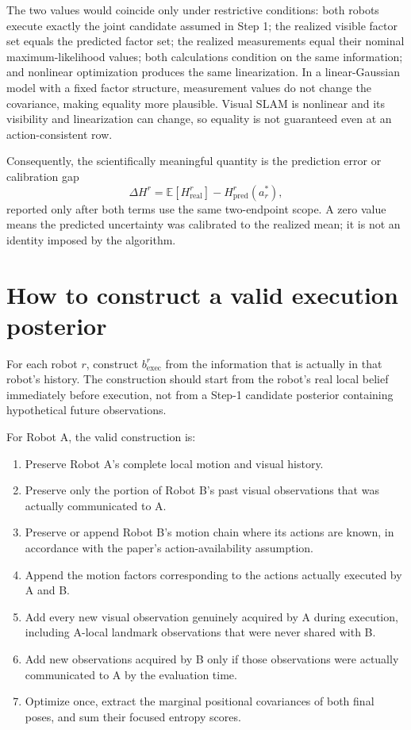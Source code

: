\documentclass[11pt,a4paper]{article}
\begin{document}
The two values would coincide only under restrictive conditions: both robots
execute exactly the joint candidate assumed in Step 1; the realized visible
factor set equals the predicted factor set; the realized measurements equal
their nominal maximum-likelihood values; both calculations condition on the
same information; and nonlinear optimization produces the same linearization.
In a linear-Gaussian model with a fixed factor structure, measurement values
do not change the covariance, making equality more plausible.  Visual SLAM is
nonlinear and its visibility and linearization can change, so equality is not
guaranteed even at an action-consistent row.

Consequently, the scientifically meaningful quantity is the prediction error
or calibration gap
\[
  \Delta H^r
  =\mathbb E\!\left[H_{\mathrm{real}}^r\right]
   -H_{\mathrm{pred}}^r(a_r^*),
\]
reported only after both terms use the same two-endpoint scope.  A zero value
means the predicted uncertainty was calibrated to the realized mean; it is not
an identity imposed by the algorithm.

\section{How to construct a valid execution posterior}

For each robot $r$, construct $b_{\mathrm{exec}}^r$ from the information that
is actually in that robot's history.  The construction should start from the
robot's real local belief immediately before execution, not from a Step-1
candidate posterior containing hypothetical future observations.

For Robot A, the valid construction is:
\begin{enumerate}
  \item Preserve Robot A's complete local motion and visual history.
  \item Preserve only the portion of Robot B's past visual observations that
        was actually communicated to A.
  \item Preserve or append Robot B's motion chain where its actions are known,
        in accordance with the paper's action-availability assumption.
  \item Append the motion factors corresponding to the actions actually
        executed by A and B.
  \item Add every new visual observation genuinely acquired by A during
        execution, including A-local landmark observations that were never
        shared with B.
  \item Add new observations acquired by B only if those observations were
        actually communicated to A by the evaluation time.
  \item Optimize once, extract the marginal positional covariances of both
        final poses, and sum their focused entropy scores.
\end{enumerate}
\end{document}
